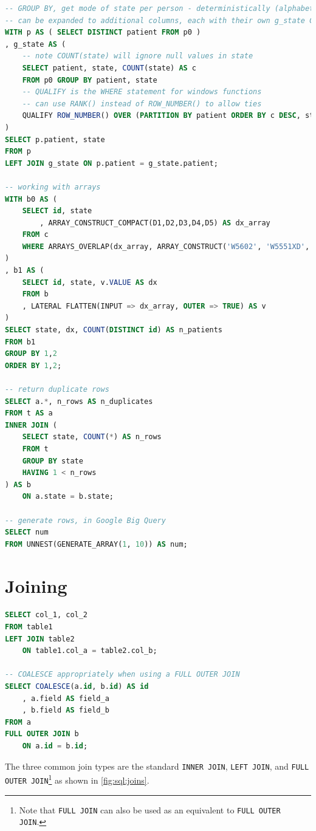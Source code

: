 \begin{lstlisting}[language=SQL]
-- GROUP BY, get mode of state per person - deterministically (alphabetical order)
-- can be expanded to additional columns, each with their own g_state CTEs
WITH p AS ( SELECT DISTINCT patient FROM p0 )
, g_state AS (
	-- note COUNT(state) will ignore null values in state
	SELECT patient, state, COUNT(state) AS c
	FROM p0 GROUP BY patient, state
	-- QUALIFY is the WHERE statement for windows functions
	-- can use RANK() instead of ROW_NUMBER() to allow ties
	QUALIFY ROW_NUMBER() OVER (PARTITION BY patient ORDER BY c DESC, state ASC) = 1
)
SELECT p.patient, state
FROM p
LEFT JOIN g_state ON p.patient = g_state.patient;

-- working with arrays
WITH b0 AS (
	SELECT id, state
		, ARRAY_CONSTRUCT_COMPACT(D1,D2,D3,D4,D5) AS dx_array
	FROM c
	WHERE ARRAYS_OVERLAP(dx_array, ARRAY_CONSTRUCT('W5602', 'W5551XD', 'W5803XA'))
)
, b1 AS (
	SELECT id, state, v.VALUE AS dx
	FROM b
	, LATERAL FLATTEN(INPUT => dx_array, OUTER => TRUE) AS v
)
SELECT state, dx, COUNT(DISTINCT id) AS n_patients
FROM b1
GROUP BY 1,2
ORDER BY 1,2;

-- return duplicate rows
SELECT a.*, n_rows AS n_duplicates
FROM t AS a
INNER JOIN (
	SELECT state, COUNT(*) AS n_rows
	FROM t
	GROUP BY state
	HAVING 1 < n_rows
) AS b
	ON a.state = b.state;

-- generate rows, in Google Big Query
SELECT num
FROM UNNEST(GENERATE_ARRAY(1, 10)) AS num;
\end{lstlisting}

\section{Joining}
\label{sql:join}

\begin{lstlisting}[language=SQL]
SELECT col_1, col_2
FROM table1
LEFT JOIN table2
	ON table1.col_a = table2.col_b;

-- COALESCE appropriately when using a FULL OUTER JOIN
SELECT COALESCE(a.id, b.id) AS id
	, a.field AS field_a
	, b.field AS field_b
FROM a
FULL OUTER JOIN b
	ON a.id = b.id;
\end{lstlisting}

The three common join types are the standard
\texttt{INNER JOIN}, \texttt{LEFT JOIN},
and \texttt{FULL OUTER JOIN}\footnote{Note that
\texttt{FULL JOIN} can also be used as an equivalent to \texttt{FULL OUTER JOIN}.} as
shown in \cref{fig:sql:joins}.

